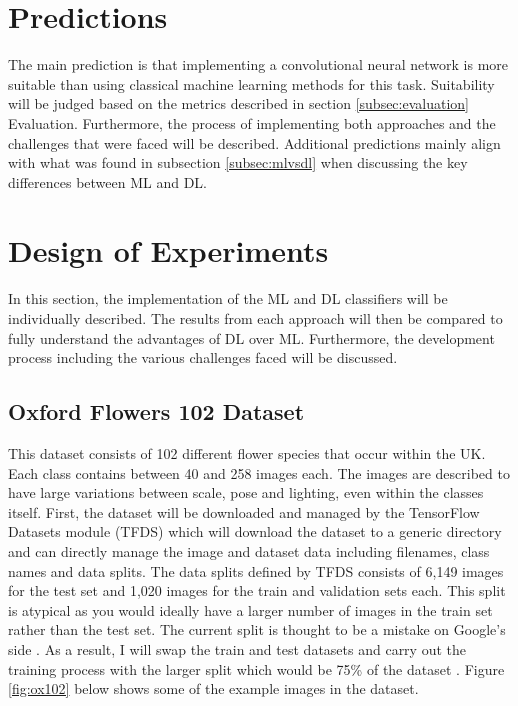 \documentclass[12pt,a4paper]{report}
\begin{document}
\section{Predictions}

The main prediction is that implementing a convolutional neural network is more suitable than using classical machine 
learning methods for this task. Suitability will be judged based on the metrics described in section
\ref{subsec:evaluation} Evaluation. Furthermore, the process of implementing 
both approaches and the challenges that were faced will be described. Additional predictions mainly align with what was 
found in subsection \ref{subsec:mlvsdl} when discussing the key differences between ML and DL.

\section{Design of Experiments}

In this section, the implementation of the ML and DL classifiers will be individually described. The results from each
approach will then be compared to fully understand the advantages of DL over ML. Furthermore, the development process
including the various challenges faced will be discussed.

\subsection{Oxford Flowers 102 Dataset}

This dataset consists of 102 different flower species that occur within the UK. Each class contains between 40 and 258 
images each. The images are described to have large variations between scale, pose and lighting, even within the classes
itself. First, the dataset will be downloaded and managed by the TensorFlow Datasets module (TFDS) which will download 
the dataset to a generic directory and can directly manage the image and dataset data including filenames, class names 
and data splits. The data splits defined by TFDS consists of 6,149 images for the test set and 1,020 images for the 
train and validation sets each. This split is atypical as you would ideally have a larger number of images in the train 
set rather than the test set. The current split is thought to be a mistake on Google's side \citep{githubissue}. As a 
result, I will swap the train and test datasets and carry out the training process with the larger split which would be 
75\% of the dataset \citep{TFOX102}. Figure \ref{fig:ox102} below shows some of the example images in the dataset.
\end{document}

